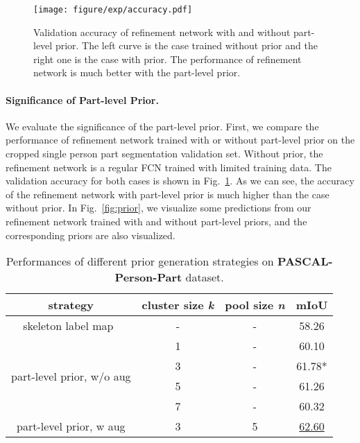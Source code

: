 \documentclass[10pt,twocolumn,letterpaper]{article}
\begin{document}
\begin{figure}[t]
\begin{center}
   \texttt{[image: figure/exp/accuracy.pdf]}
\end{center}
\vspace{-4mm}
   \caption{Validation accuracy of refinement network with and without part-level prior. The left curve is the case trained without prior and the right one is the case with prior. The performance of refinement network is much better with the part-level prior.}
\label{fig:accuracy}
\vspace{-2mm}
\end{figure}
\vspace{-2mm}
\paragraph{Significance of Part-level Prior.}
We evaluate the significance of the part-level prior. First, we compare the performance of refinement network trained with or without part-level prior on the cropped single person part segmentation validation set. Without prior, the refinement network is a regular FCN trained with limited training data. The validation accuracy for both cases is shown in Fig.~\ref{fig:accuracy}. As we can see, the accuracy of the refinement network with part-level prior is much higher than the case without prior. In Fig.~\ref{fig:prior}, we visualize some predictions from our refinement network trained with and without part-level priors,  and the corresponding priors are also visualized.

\begin{table}[t]
	\begin{center}
\begin{small}
		\begin{tabular}{c|c|c|c}
			\hline
			strategy & cluster size \emph{k} & pool size \emph{n} & mIoU\\
			\hline
			\hline
			skeleton label map~\cite{xia2017joint} & - & - & 58.26\\
            \hline
			\multirow{4}{*}{part-level prior, w/o aug} & 1 & - & 60.10\\
			     & 3 & - & 61.78*\\
			     & 5 & -  & 61.26\\
                 & 7 & -  & 60.32\\
            \hline
            part-level prior, w aug & 3 & 5 & \underline{62.60}\\
            \hline
		\end{tabular}
\end{small}
	\end{center}
	\caption{Performances of different prior generation strategies on \textbf{PASCAL-Person-Part} dataset. }
	\label{tab:strategy}
\vspace{-4mm}
\end{table}
\vspace{-2mm}
\end{document}
